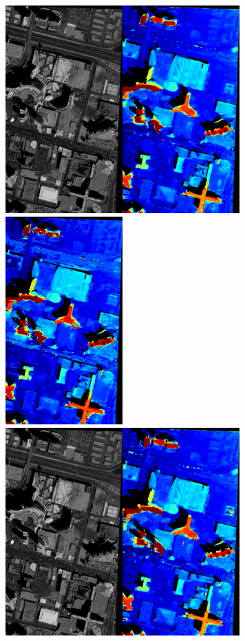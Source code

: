 \documentclass{article}
\theoremstyle{definition}
\begin{document}
\clearpage
\begin{figure}[ht]
 \centering
 \includegraphics[height=8cm]{images/SkysatLR18_240_img/1521805051081_dmap_050.png}\hspace{-0.28em}
 \includegraphics[height=8cm]{images/SkysatHR18_240/1521744514157_dmap_050.png}\\
 \vspace{1em}
 \includegraphics[height=8cm]{images/SkysatLR18_240_img/1521805051081_dmap_025.png}\hspace{-0.28em}

\end{figure}
\end{document}
